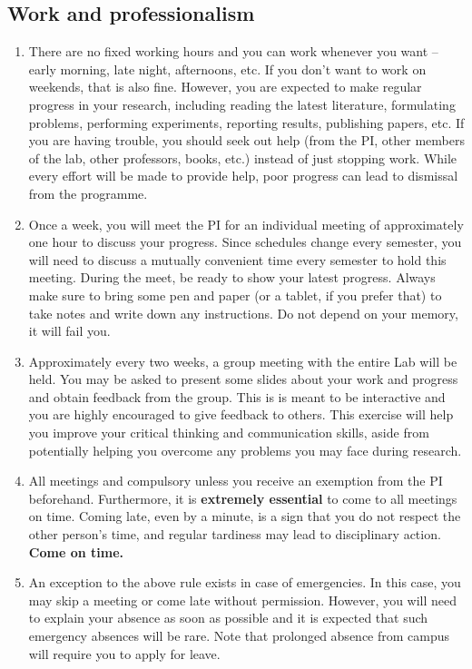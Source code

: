 \documentclass[12pt]{article}
\begin{document}
\subsection{Work and professionalism}
\begin{enumerate}
	\item There are no fixed working hours and you can work whenever you want -- early morning, late night, afternoons, etc. If you don't want to work on weekends, that is also fine. However, you are expected to make regular progress in your research, including reading the latest literature, formulating problems, performing experiments, reporting results, publishing papers, etc. If you are having trouble, you should seek out help (from the PI, other members of the lab, other professors, books, etc.) instead of just stopping work. While every effort will be made to provide help, poor progress can lead to dismissal from the programme. 
	\item Once a week, you will meet the PI for an individual meeting of approximately one hour to discuss your progress. Since schedules change every semester, you will need to discuss a mutually convenient time every semester to hold this meeting. During the meet, be ready to show your latest progress. Always make sure to bring some pen and paper (or a tablet, if you prefer that) to take notes and write down any instructions. Do not depend on your memory, it will fail you.
	\item Approximately every two weeks, a group meeting with the entire Lab will be held. You may be asked to present some slides about your work and progress and obtain feedback from the group. This is is meant to be interactive and you are highly encouraged to give feedback to others. This exercise will help you improve your critical thinking and communication skills, aside from potentially helping you overcome any problems you may face during research.
	\item All meetings and compulsory unless you receive an exemption from the PI beforehand. Furthermore, it is \textbf{extremely essential} to come to all meetings on time. Coming late, even by a minute, is a sign that you do not respect the other person's time, and regular tardiness may lead to disciplinary action. \textbf{Come on time.}
	\item An exception to the above rule exists in case of emergencies. In this case, you may skip a meeting or come late without permission. However, you will need to explain your absence as soon as possible and it is expected that such emergency absences will be rare. Note that prolonged absence from campus will require you to apply for leave.

\end{enumerate}
\end{document}
